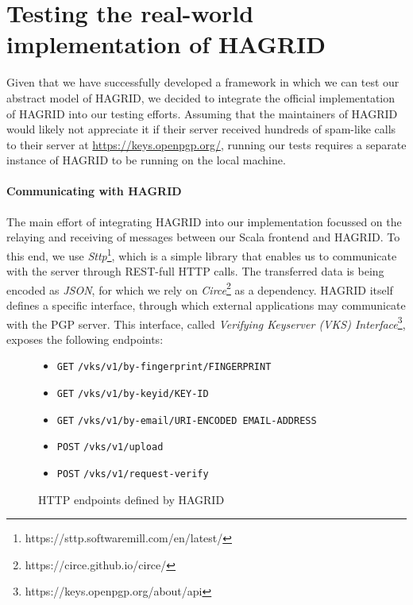 \section{Testing the real-world implementation of HAGRID}
\label{sec:real_hagrid}
Given that we have successfully developed a framework in which we can test our abstract model of HAGRID, we decided to integrate the official implementation of HAGRID into our testing efforts.
Assuming that the maintainers of HAGRID would likely not appreciate it if their server received hundreds of spam-like calls to their server at \url{https://keys.openpgp.org/}, running our tests requires a separate instance of HAGRID to be running on the local machine.

\paragraph{Communicating with HAGRID}
The main effort of integrating HAGRID into our implementation focussed on the relaying and receiving of messages between our Scala frontend and HAGRID.
To this end, we use \emph{Sttp}\footnote{https://sttp.softwaremill.com/en/latest/}, which is a simple library that enables us to communicate with the server through REST-full HTTP calls. The transferred data is being encoded as \emph{JSON}, for which we rely on \emph{Circe}\footnote{https://circe.github.io/circe/} as a dependency. HAGRID itself defines a specific interface, through which external applications may communicate with the PGP server. This interface, called \emph{Verifying Keyserver (VKS) Interface}\footnote{https://keys.openpgp.org/about/api}, exposes the following endpoints: 
\begin{figure}[h]
    \begin{itemize}
        \item \texttt{GET}  \texttt{/vks/v1/by-fingerprint/FINGERPRINT}
        \item \texttt{GET}  \texttt{/vks/v1/by-keyid/KEY-ID}
        \item \texttt{GET}  \texttt{/vks/v1/by-email/URI-ENCODED EMAIL-ADDRESS}
        \item \texttt{POST} \texttt{/vks/v1/upload}
        \item \texttt{POST} \texttt{/vks/v1/request-verify}
    \end{itemize}
    \caption{HTTP endpoints defined by HAGRID}
\end{figure}

